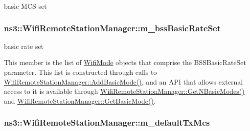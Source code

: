 basic M\+CS set 

\subsubsection[{\texorpdfstring{m\+\_\+bss\+Basic\+Rate\+Set}{m_bssBasicRateSet}}]{ ns3\+::\+Wifi\+Remote\+Station\+Manager\+::m\+\_\+bss\+Basic\+Rate\+Set\hspace{0.3cm}{\ttfamily [private]}}\hypertarget{classns3_1_1WifiRemoteStationManager_acc2500f3f9208b6227adf57bbebb5bd7}{}\label{classns3_1_1WifiRemoteStationManager_acc2500f3f9208b6227adf57bbebb5bd7}


basic rate set 

This member is the list of \hyperlink{classns3_1_1WifiMode}{Wifi\+Mode} objects that comprise the B\+S\+S\+Basic\+Rate\+Set parameter. This list is constructed through calls to \hyperlink{classns3_1_1WifiRemoteStationManager_a169339a6312b10580cb6a940228833f0}{Wifi\+Remote\+Station\+Manager\+::\+Add\+Basic\+Mode()}, and an A\+PI that allows external access to it is available through \hyperlink{classns3_1_1WifiRemoteStationManager_a1528f837dd70f82cda248f1434b94357}{Wifi\+Remote\+Station\+Manager\+::\+Get\+N\+Basic\+Modes()} and \hyperlink{classns3_1_1WifiRemoteStationManager_a8e4599eafc71fa98f6869e3d8908ea24}{Wifi\+Remote\+Station\+Manager\+::\+Get\+Basic\+Mode()}. 
\subsubsection[{\texorpdfstring{m\+\_\+default\+Tx\+Mcs}{m_defaultTxMcs}}]{ ns3\+::\+Wifi\+Remote\+Station\+Manager\+::m\+\_\+default\+Tx\+Mcs\hspace{0.3cm}{\ttfamily [private]}}\hypertarget{classns3_1_1WifiRemoteStationManager_a19da425b2dc81ff24151159dc9679aec}{}\label{classns3_1_1WifiRemoteStationManager_a19da425b2dc81ff24151159dc9679aec}


